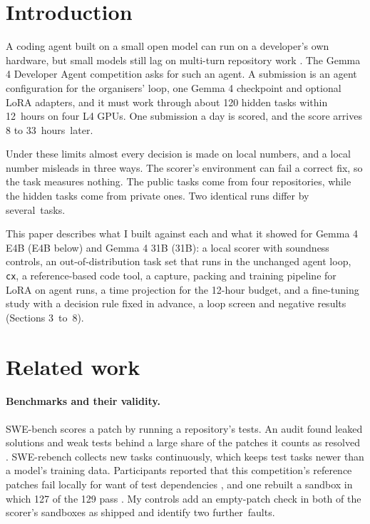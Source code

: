 \section{Introduction}\label{sec:intro}

A coding agent built on a small open model can run on a developer's own hardware, but small models still lag on multi-turn repository work \citep{sweprotege}. The Gemma 4 Developer Agent competition \citep{g4comp} asks for such an agent. A submission is an agent configuration for the organisers' loop, one Gemma 4 checkpoint and optional LoRA adapters, and it must work through about 120 hidden tasks within 12~hours on four L4 GPUs. One submission a day is scored, and the score arrives 8 to 33~hours~later.

Under these limits almost every decision is made on local numbers, and a local number misleads in three ways. The scorer's environment can fail a correct fix, so the task measures nothing. The public tasks come from four repositories, while the hidden tasks come from private ones. Two identical runs differ by several~tasks.

This paper describes what I built against each and what it showed for Gemma 4 E4B (E4B below) and Gemma 4 31B (31B): a local scorer with soundness controls, an out-of-distribution task set that runs in the unchanged agent loop, \texttt{cx}, a reference-based code tool, a capture, packing and training pipeline for LoRA on agent runs, a time projection for the 12-hour budget, and a fine-tuning study with a decision rule fixed in advance, a loop screen and negative results (Sections 3~to~8).


\section{Related work}\label{sec:related}

\paragraph{Benchmarks and their validity.} SWE-bench \citep{swebench} scores a patch by running a repository's tests. An audit found leaked solutions and weak tests behind a large share of the patches it counts as resolved \citep{swebenchplus}. SWE-rebench \citep{swerebench} collects new tasks continuously, which keeps test tasks newer than a model's training data. Participants reported that this competition's reference patches fail locally for want of test dependencies \citep{forumdeps}, and one rebuilt a sandbox in which 127 of the 129 pass \citep{forumgold}. My controls add an empty-patch check in both of the scorer's sandboxes as shipped and identify two further~faults.

